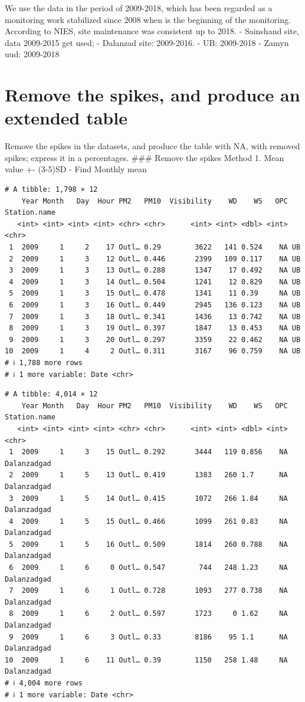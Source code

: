 \documentclass[
]{agujournal2019}
\begin{document}
We use the data in the period of 2009-2018, which has been regarded as a
monitoring work stabilized since 2008 when is the beginning of the
monitoring. According to NIES, site maintenance was consistent up to
2018. - Sainshand site, data 2009-2015 get used; - Dalanzad site:
2009-2016. - UB: 2009-2018 - Zamyn uud: 2009-2018

\section{Remove the spikes, and produce an extended
table}\label{remove-the-spikes-and-produce-an-extended-table}

Remove the spikes in the datasets, and produce the table with NA, with
removed spikes; express it in a percentages. \#\#\# Remove the spikes
Method 1. Mean value +- (3-5)SD - Find Monthly mean

\begin{verbatim}
# A tibble: 1,798 × 12
    Year Month   Day  Hour PM2   PM10  Visibility    WD    WS   OPC Station.name
   <int> <int> <int> <int> <chr> <chr>      <int> <int> <dbl> <int> <chr>       
 1  2009     1     2    17 Outl… 0.29        3622   141 0.524    NA UB          
 2  2009     1     3    12 Outl… 0.446       2399   109 0.117    NA UB          
 3  2009     1     3    13 Outl… 0.288       1347    17 0.492    NA UB          
 4  2009     1     3    14 Outl… 0.504       1241    12 0.829    NA UB          
 5  2009     1     3    15 Outl… 0.478       1341    11 0.39     NA UB          
 6  2009     1     3    16 Outl… 0.449       2945   136 0.123    NA UB          
 7  2009     1     3    18 Outl… 0.341       1436    13 0.742    NA UB          
 8  2009     1     3    19 Outl… 0.397       1847    13 0.453    NA UB          
 9  2009     1     3    20 Outl… 0.297       3359    22 0.462    NA UB          
10  2009     1     4     2 Outl… 0.311       3167    96 0.759    NA UB          
# ℹ 1,788 more rows
# ℹ 1 more variable: Date <chr>
\end{verbatim}

\begin{verbatim}
# A tibble: 4,014 × 12
    Year Month   Day  Hour PM2   PM10  Visibility    WD    WS   OPC Station.name
   <int> <int> <int> <int> <chr> <chr>      <int> <int> <dbl> <int> <chr>       
 1  2009     1     3    15 Outl… 0.292       3444   119 0.856    NA Dalanzadgad 
 2  2009     1     5    13 Outl… 0.419       1383   260 1.7      NA Dalanzadgad 
 3  2009     1     5    14 Outl… 0.415       1072   266 1.84     NA Dalanzadgad 
 4  2009     1     5    15 Outl… 0.466       1099   261 0.83     NA Dalanzadgad 
 5  2009     1     5    16 Outl… 0.509       1814   260 0.788    NA Dalanzadgad 
 6  2009     1     6     0 Outl… 0.547        744   248 1.23     NA Dalanzadgad 
 7  2009     1     6     1 Outl… 0.728       1093   277 0.738    NA Dalanzadgad 
 8  2009     1     6     2 Outl… 0.597       1723     0 1.62     NA Dalanzadgad 
 9  2009     1     6     3 Outl… 0.33        8186    95 1.1      NA Dalanzadgad 
10  2009     1     6    11 Outl… 0.39        1150   258 1.48     NA Dalanzadgad 
# ℹ 4,004 more rows
# ℹ 1 more variable: Date <chr>
\end{verbatim}
\end{document}
